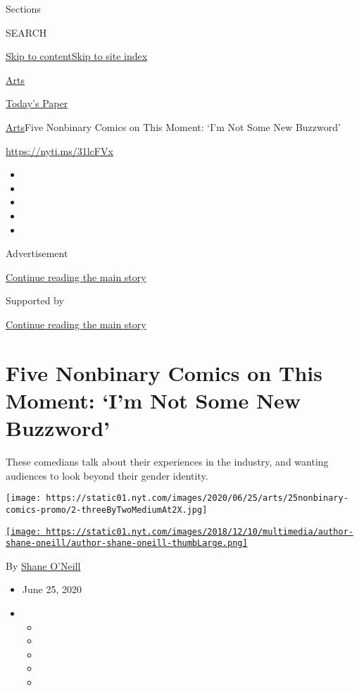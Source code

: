 Sections

SEARCH

\protect\hyperlink{site-content}{Skip to
content}\protect\hyperlink{site-index}{Skip to site index}

\href{https://www.nytimes.com/section/arts}{Arts}

\href{https://myaccount.nytimes.com/auth/login?response_type=cookie\&client_id=vi}{}

\href{https://www.nytimes.com/section/todayspaper}{Today's Paper}

\href{/section/arts}{Arts}\textbar{}Five Nonbinary Comics on This
Moment: `I'm Not Some New Buzzword'

\href{https://nyti.ms/31lcFVx}{https://nyti.ms/31lcFVx}

\begin{itemize}
\item
\item
\item
\item
\item
\end{itemize}

Advertisement

\protect\hyperlink{after-top}{Continue reading the main story}

Supported by

\protect\hyperlink{after-sponsor}{Continue reading the main story}

\hypertarget{five-nonbinary-comics-on-this-moment-im-not-some-new-buzzword}{%
\section{Five Nonbinary Comics on This Moment: `I'm Not Some New
Buzzword'}\label{five-nonbinary-comics-on-this-moment-im-not-some-new-buzzword}}

These comedians talk about their experiences in the industry, and
wanting audiences to look beyond their gender identity.

\texttt{[image: https://static01.nyt.com/images/2020/06/25/arts/25nonbinary-comics-promo/2-threeByTwoMediumAt2X.jpg]}

\href{https://www.nytimes.com/by/shane-oneill}{\texttt{[image: https://static01.nyt.com/images/2018/12/10/multimedia/author-shane-oneill/author-shane-oneill-thumbLarge.png]}}

By \href{https://www.nytimes.com/by/shane-oneill}{Shane O'Neill}

\begin{itemize}
\item
  June 25, 2020
\item
  \begin{itemize}
  \item
  \item
  \item
  \item
  \item
  \end{itemize}
\end{itemize}

